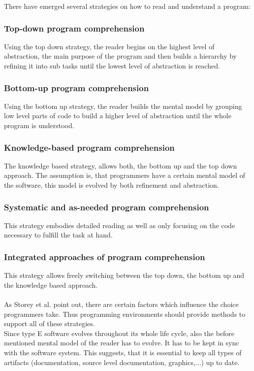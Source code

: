 There have emerged several strategies on how to read and understand a program\cite{Storey:1999:CDE:308936.308940}\cite{Storey:1997:PUT:832304.836998}:
\subsubsection*{Top-down program comprehension}
Using the top down strategy, the reader begins on the highest level of abstraction, the main purpose of the program and then builds a hierarchy by refining it into sub tasks until the lowest level of abstraction is reached.
\subsubsection*{Bottom-up program comprehension} Using the bottom up strategy, the reader builds the mental model by grouping low level parts of code to build a higher level of abstraction until the whole program is understood.
\subsubsection*{Knowledge-based program comprehension} The knowledge based strategy, allows both, the bottom up and the top down approach. The assumption is, that programmers have a certain mental model of the software, this model is evolved by both refinement and abstraction.
\subsubsection*{Systematic and as-needed program comprehension} This strategy embodies detailed reading as well as only focusing on the code necessary to fulfill the task at hand.
\subsubsection*{Integrated approaches of program comprehension} This strategy allows freely switching between the top down, the bottom up and the knowledge based approach.
\\\\
As Storey et al.\cite{Storey:1999:CDE:308936.308940} point out, there are certain factors which influence the choice programmers take. Thus programming environments should provide methods to support all of these strategies.
\\
Since type E software evolves throughout its whole life cycle, also the before mentioned mental model of the reader has to evolve. It has to be kept in sync with the software system. This suggests, that it is essential to keep all types of artifacts (documentation, source level documentation, graphics,...) up to date.

